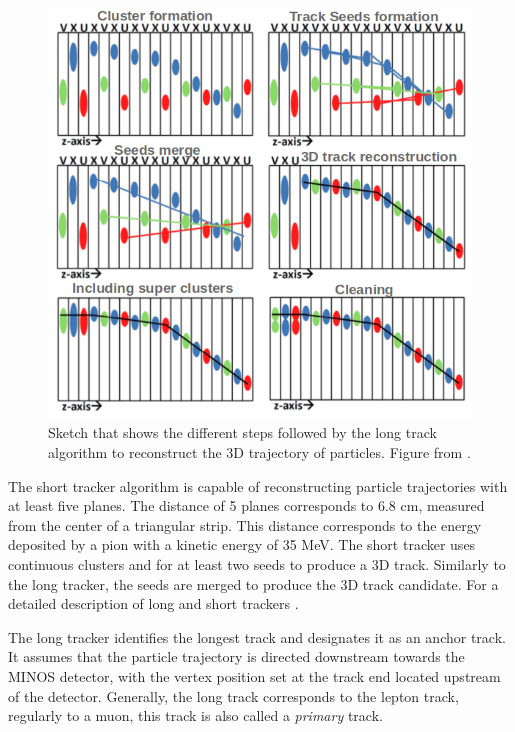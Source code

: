 \begin{figure}[!htb]
    \centering
    \includegraphics[scale=0.5]{Figures/Chapter2/LongTracking.png}
    \caption{Sketch that shows the different steps followed by the long track algorithm to reconstruct the 3D trajectory of particles. Figure from \cite{EberlyThesis}.}\label{fig:MnvExp:MnvDetector:DataReconstruction:LongTrackreconstruction}
\end{figure}

The short tracker algorithm is capable of reconstructing particle trajectories with at least five planes. The distance of 5 planes corresponds to 6.8 cm, measured from the center of a triangular strip. This distance corresponds to the energy deposited by a pion with a kinetic energy of 35 MeV. The short tracker uses continuous clusters and for at least two seeds to produce a 3D track. Similarly to the long tracker, the seeds are merged to produce the 3D track candidate. For a detailed description of long and short trackers \cite{AaronThesis}.

The long tracker identifies the longest track and designates it as an anchor track. It assumes that the particle trajectory is directed downstream towards the MINOS detector, with the vertex position set at the track end located upstream of the detector. Generally, the long track corresponds to the lepton track, regularly to a muon, this track is also called a \textit{primary} track.

